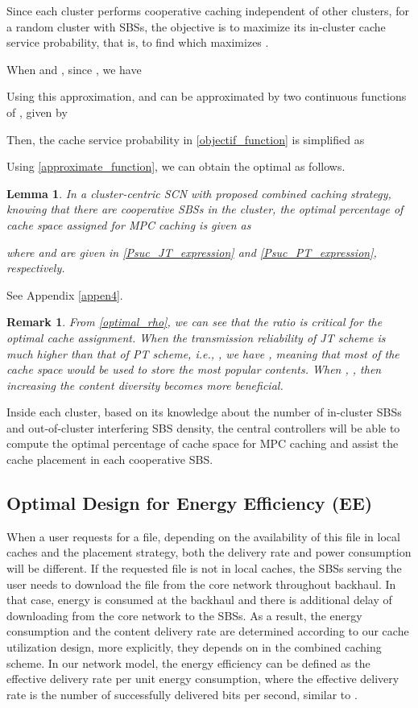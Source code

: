 \documentclass[twocolumns,10pt]{IEEEtran}
\newtheorem{lemma}{Lemma}
\newtheorem{remark}{Remark}
\begin{document}
Since each cluster performs cooperative caching independent of other clusters, for a random cluster with  SBSs, the objective is to maximize its in-cluster cache service probability, that is, to find  which maximizes .

When  and , since , we have \cite{robert}

Using this approximation,  and  can be approximated by two continuous functions of , given by

Then, the cache service probability in \eqref{objectif_function} is simplified as

Using \eqref{approximate_function}, we can obtain the optimal  as follows.


\begin{lemma}
	\label{lemma4}
	In a cluster-centric SCN with proposed combined caching strategy, knowing that there are  cooperative SBSs in the cluster, the optimal percentage of cache space assigned for MPC caching is given as
	
	where  and  are given in \eqref{Psuc_JT_expression} and \eqref{Psuc_PT_expression}, respectively.
\end{lemma}
\begin{IEEEproof}
	\textnormal{See Appendix \ref{appen4}.}
\end{IEEEproof}


\begin{remark}
From \eqref{optimal_rho}, we can see that the ratio  is critical for the optimal cache assignment. When the transmission reliability of JT scheme is much higher than that of PT scheme, i.e., , we have , meaning that most of the cache space would be used to store the most popular contents. When , , then increasing the content diversity becomes more beneficial. 
\end{remark}

Inside each cluster, based on its knowledge about the number of in-cluster SBSs and out-of-cluster interfering SBS density, the central controllers will be able to compute the optimal percentage of cache space for MPC caching and assist the cache placement in each cooperative SBS.


\subsection{Optimal Design for Energy Efficiency (EE)}
\label{ee_optimization}
When a user requests for a file, depending on the availability of this file in local caches and the placement strategy, both the delivery rate and power consumption will be different. 
If the requested file is not in local caches, the SBSs serving the user needs to download the file from the core network throughout backhaul.
In that case, energy is consumed at the backhaul and there is additional delay of downloading from the core network to the SBSs.
As a result, the energy consumption and the content delivery rate are determined according to our cache utilization design, more explicitly, they depends on  in the combined caching scheme.
In our network model, the energy efficiency can be defined as
the effective delivery rate per unit energy consumption, where the effective delivery rate is the number of successfully delivered bits per second, similar to \cite{energy_efficiency}.
\end{document}
